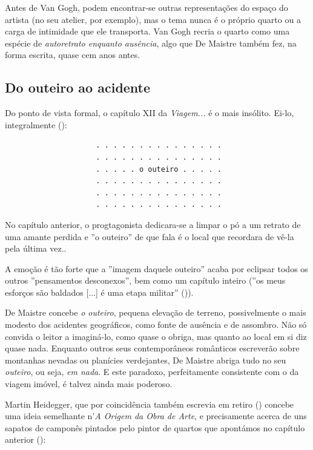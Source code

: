 \documentclass[12pt]{article}
\begin{document}
Antes de Van Gogh, podem encontrar-se outras representações do espaço
do artista (no seu atelier, por exemplo), mas o tema nunca é o próprio
quarto ou a carga de intimidade que ele transporta. Van Gogh recria o
quarto como uma espécie de \emph{autoretrato enquanto ausência}, algo
que De Maistre também fez, na forma escrita, quase cem anos antes.

\subsection{Do outeiro ao acidente}

Do ponto de vista formal, o capítulo XII da \emph{Viagem...} é o mais
insólito. Ei-lo, integralmente (\cite[p.36]{demaistre}):

\begin{center}
\begin{verbatim}
                     . . . . . . . . . . . . . . .
                     . . . . . . . . . . . . . . .
                     . . . . . o outeiro . . . . .
                     . . . . . . . . . . . . . . .
                     . . . . . . . . . . . . . . .
                     . . . . . . . . . . . . . . .
\end{verbatim}
\end{center}

No capítulo anterior, o progtagonista dedicara-se a limpar o pó a um
retrato de uma amante perdida e ''o outeiro'' de que fala é o local
que recordara de vê-la pela última vez..

A emoção é tão forte que a ''imagem daquele outeiro'' acaba por
eclipsar todos os outros ''pensamentos desconexos'', bem como um
capítulo inteiro (''os meus esforços são baldados [...] é uma etapa
militar'' (\cite[p.36,p.39]{demaistre})).

De Maistre concebe \emph{o outeiro}, pequena elevação de terreno,
possivelmente o mais modesto dos acidentes geográficos, como fonte de
ausência e de assombro. Não só convida o leitor a imaginá-lo, como
quase o obriga, mas quanto ao local em si diz quase nada. Enquanto
outros seus contemporâneos românticos escreverão sobre montanhas
nevadas ou planícies verdejantes, De Maistre abriga tudo no seu
\emph{outeiro}, ou seja, \emph{em nada}. E este paradoxo,
perfeitamente consistente com o da viagem imóvel, é talvez ainda mais
poderoso.

Martin Heidegger, que por coincidência também escrevia em retiro
(\cite{heideggerhut}) concebe uma ideia semelhante n'\emph{A Origem da
  Obra de Arte}, e precisamente acerca de uns sapatos de camponês
pintados pelo pintor de quartos que apontámos no capítulo anterior
(\cite[p.24]{heidegger}):
\end{document}
